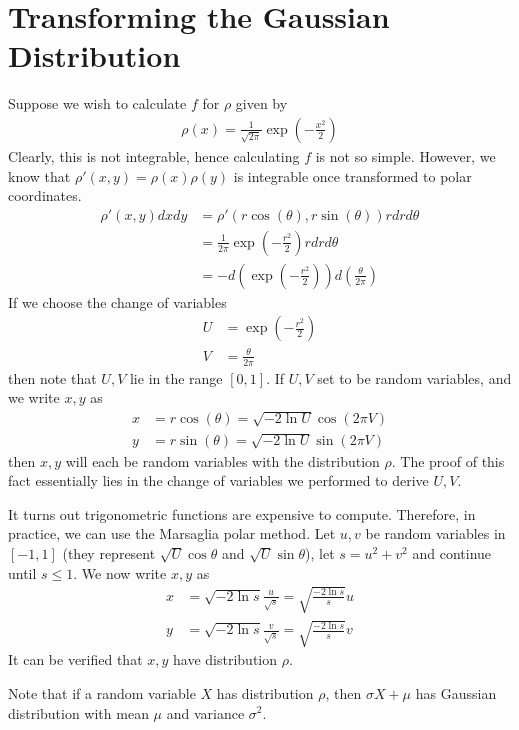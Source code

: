 \documentclass{article}
\begin{document}
\section{Transforming the Gaussian Distribution}

Suppose we wish to calculate $f$ for $\rho$ given by
\begin{align*}
    \rho(x) = \frac{1}{\sqrt{2\pi}} \exp\left(-\frac{x^2}{2}\right)
\end{align*}
Clearly, this is not integrable, hence calculating $f$ is not so simple.
However, we know that $\rho'(x, y) = \rho(x)\rho(y)$ is integrable once transformed to polar coordinates.
\begin{align*}
    \rho'(x, y) dx dy &= \rho'(r \cos(\theta), r \sin(\theta)) r dr d\theta \\
    &= \frac{1}{2 \pi} \exp\left(-\frac{r^2}{2}\right) r dr d\theta \\
    &= - d \left(\exp\left(-\frac{r^2}{2}\right) \right) d\left(\frac{\theta}{2\pi}\right)
\end{align*}
If we choose the change of variables
\begin{align*}
    U &= \exp\left(-\frac{r^2}{2}\right) \\
    V &= \frac{\theta}{2\pi}
\end{align*}
then note that $U, V$ lie in the range $[0, 1]$. If $U, V$ set to be random variables,
and we write $x, y$ as
\begin{align*}
    x &= r \cos(\theta) = \sqrt{-2 \ln U} \cos(2 \pi V) \\
    y &= r \sin(\theta) = \sqrt{-2 \ln U} \sin(2 \pi V)
\end{align*}
then $x, y$ will each be random variables with the distribution $\rho$.
The proof of this fact essentially lies in the change of variables we performed to derive $U, V$.

It turns out trigonometric functions are expensive to compute. Therefore, in practice, we can use the Marsaglia polar method.
Let $u, v$ be random variables in $[-1, 1]$ (they represent $\sqrt{U} \cos{\theta}$ and $\sqrt{U} \sin {\theta}$), let $s = u^2 + v^2$ and continue until $s \leq 1$.
We now write $x, y$ as
\begin{align*}
    x &= \sqrt{-2\ln s} \frac{u}{\sqrt{s}} = \sqrt{\frac{-2\ln s}{s}} u \\
    y &= \sqrt{-2\ln s} \frac{v}{\sqrt{s}} = \sqrt{\frac{-2\ln s}{s}} v
\end{align*}
It can be verified that $x, y$ have distribution $\rho$.

Note that if a random variable $X$ has distribution $\rho$, then $\sigma X + \mu$ has Gaussian distribution with mean $\mu$ and variance $\sigma^2$.
\end{document}
